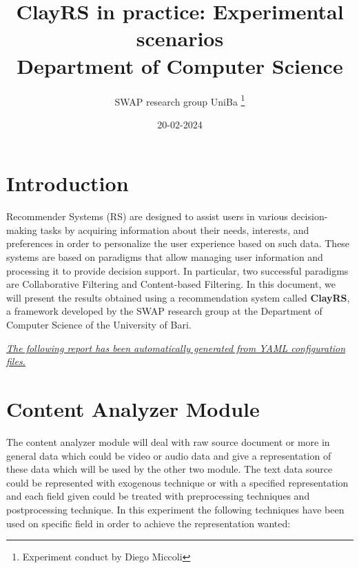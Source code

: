\documentclass[11pt]{article}
\title{\textbf{ ClayRS in practice: Experimental scenarios }\\ [1cm] Department of Computer Science}
\author{ SWAP research group UniBa \thanks{Experiment conduct by Diego Miccoli}}
\date{20-02-2024}
\begin{document}
\maketitle

\section{Introduction}\label{sec:intro}
Recommender Systems (RS) are designed to assist users in various decision-making tasks by acquiring
information about their needs, interests, and preferences in order to personalize the user experience
based on such data.
These systems are based on paradigms that allow managing user information and processing
it to provide decision support.
In particular, two successful paradigms are Collaborative Filtering and Content-based Filtering.
In this document, we will present the results obtained using a recommendation system called \textbf{ClayRS},
a framework developed by the SWAP research group at the Department of Computer Science of the University of Bari.\\
\hfill\break

\textit{\ul{The following report has been automatically generated from YAML configuration files.}}

\hfill\break

\hfill\break
\hfill\break



\section{Content Analyzer Module}\label{sec:ca}
The content analyzer module will deal with raw source document or more in general data which could be
video or audio data and give a representation of these data which will be used by the other two module.
The text data source could be represented with exogenous technique or with a specified representation
and each field given could be treated with preprocessing techniques and postprocessing technique.
In this experiment the following techniques have been used on specific field in order to achieve the
representation wanted:
\hfill\break
\hfill\break
\end{document}
